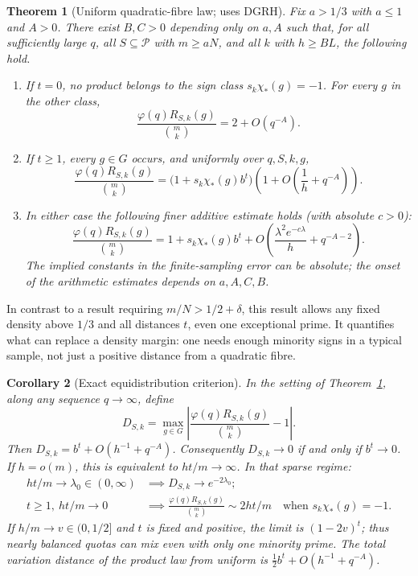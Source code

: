 \documentclass[11pt]{article}
\newtheorem{theorem}{Theorem}[section]
\newtheorem{corollary}[theorem]{Corollary}
\theoremstyle{remark}\newtheorem{remark}[theorem]{Remark}
\newcommand{\Pool}{\mathcal P}
\newcommand{\abs}[1]{\left|#1\right|}
\newcommand{\normcount}{\frac{\varphi(q)R_{S,k}(g)}{\binom mk}}
\begin{document}
\begin{theorem}[Uniform quadratic-fibre law; uses DGRH]\label{thm:main}
Fix $a>1/3$ with $a\le1$ and $A>0$. There exist $B,C>0$ depending only on $a,A$ such that, for all sufficiently large $q$, all $S\subseteq\Pool$ with $m\ge aN$, and all $k$ with $h\ge B L$, the following hold.
\begin{enumerate}
\item If $t=0$, no product belongs to the sign class $s_k\chi_*(g)=-1$. For every $g$ in the other class,
\[
 \normcount=2+O(q^{-A}).
\]
\item If $t\ge1$, every $g\in G$ occurs, and uniformly over $q,S,k,g$,
\begin{equation}\label{eq:relative}
 \normcount=\bigl(1+s_k\chi_*(g)b^t\bigr)
     \left(1+O\left(\frac1h+q^{-A}\right)\right).
\end{equation}
\item In either case the following finer additive estimate holds (with absolute $c>0$):
\begin{equation}\label{eq:additive}
 \normcount=1+s_k\chi_*(g)b^t
   +O\left(\frac{\lambda^2 e^{-c\lambda}}{h}+q^{-A-2}\right).
\end{equation}
The implied constants in the finite-sampling error can be absolute; the onset of the arithmetic estimates depends on $a,A,C,B$.
\end{enumerate}
\end{theorem}

In contrast to a result requiring $m/N>1/2+\delta$, this result allows any fixed density above $1/3$ and all distances $t$, even one exceptional prime. It quantifies what can replace a density margin: one needs enough minority signs in a typical sample, not just a positive distance from a quadratic fibre.

\begin{corollary}[Exact equidistribution criterion]\label{cor:criterion}
In the setting of Theorem~\ref{thm:main}, along any sequence $q\to\infty$, define
\[
 D_{S,k}=\max_{g\in G}\abs{\frac{\varphi(q)R_{S,k}(g)}{\binom mk}-1}.
\]
Then $D_{S,k}=b^t+O(h^{-1}+q^{-A})$. Consequently $D_{S,k}\to0$ if and only if $b^t\to0$.
If $h=o(m)$, this is equivalent to $ht/m\to\infty$. In that sparse regime:
\begin{align*}
 ht/m\to\lambda_0\in(0,\infty)&\implies D_{S,k}\to e^{-2\lambda_0};\\
 t\ge1,\ ht/m\to0&\implies
 \frac{\varphi(q)R_{S,k}(g)}{\binom mk}\sim 2ht/m
 \quad\text{when }s_k\chi_*(g)=-1.
\end{align*}
If $h/m\to v\in(0,1/2]$ and $t$ is fixed and positive, the limit is $(1-2v)^t$; thus nearly balanced quotas can mix even with only one minority prime. The total variation distance of the product law from uniform is $\tfrac12 b^t+O(h^{-1}+q^{-A})$.
\end{corollary}
\end{document}
